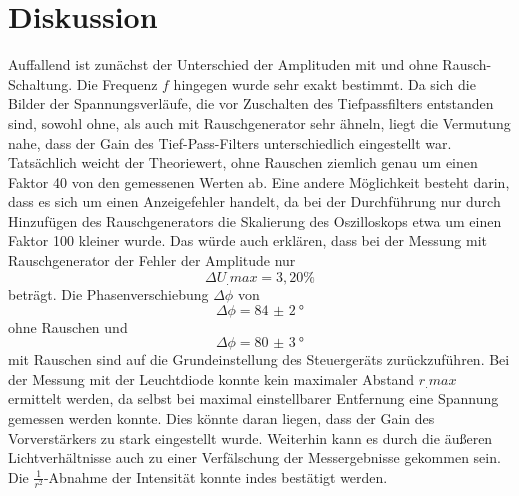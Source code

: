 \section{Diskussion}
\label{sec:Diskussion}
Auffallend ist zunächst der Unterschied der Amplituden mit und ohne Rausch-Schaltung.
Die Frequenz $f$ hingegen wurde sehr exakt bestimmt.
Da sich die Bilder der Spannungsverläufe, die vor Zuschalten des Tiefpassfilters entstanden sind, sowohl ohne, als auch mit Rauschgenerator sehr ähneln, liegt die Vermutung nahe, dass der Gain des Tief-Pass-Filters unterschiedlich eingestellt war. Tatsächlich weicht der Theoriewert, ohne Rauschen ziemlich genau um einen Faktor 40 von den gemessenen Werten ab.
Eine andere Möglichkeit besteht darin, dass es sich um einen Anzeigefehler handelt, da bei der Durchführung nur durch Hinzufügen des Rauschgenerators die Skalierung des Oszilloskops etwa um einen Faktor 100 kleiner wurde.
Das würde auch erklären, dass bei der Messung mit Rauschgenerator der Fehler der Amplitude nur
\[
\Delta U_.{max}= 3,20\%
\]
beträgt.
Die Phasenverschiebung $\Delta\phi$ von
\[
\Delta\phi = \SI{84(2)}{\degree}
\]
ohne Rauschen und
\[
\Delta\phi = \SI{80(3)}{\degree}
\]
mit Rauschen sind auf die Grundeinstellung des Steuergeräts zurückzuführen.
Bei der Messung mit der Leuchtdiode konnte kein maximaler Abstand $r_.{max}$ ermittelt werden, da selbst bei maximal einstellbarer Entfernung eine Spannung gemessen werden konnte.
Dies könnte daran liegen, dass der Gain des Vorverstärkers zu stark eingestellt wurde.
Weiterhin kann es durch die äußeren Lichtverhältnisse auch zu einer Verfälschung der Messergebnisse gekommen sein. Die $\frac{1}{r^2}$-Abnahme der Intensität konnte indes bestätigt werden.
